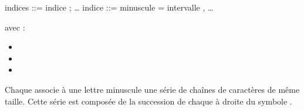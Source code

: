 \documentclass[letterpaper,10pt,french]{sphinxmanual}
\begin{document}
\begin{sphinxVerbatim}[commandchars=\\\{\}]
\PYGZlt{}indices\PYGZgt{} ::= \PYGZlt{}indice\PYGZgt{} ; …
\PYGZlt{}indice\PYGZgt{} ::= \PYGZlt{}minuscule\PYGZgt{} = \PYGZlt{}intervalle\PYGZgt{} , …
\end{sphinxVerbatim}

\sphinxAtStartPar
avec :
\begin{itemize}
\item {} 
\sphinxAtStartPar
{}

\item {} 
\sphinxAtStartPar
{}

\item {} 
\sphinxAtStartPar
{}

\end{itemize}

\sphinxAtStartPar
Chaque  associe à une lettre minuscule une série de chaînes de
caractères de même taille.
Cette série est composée de la succession de chaque
 à droite du symbole \sphinxcode{\sphinxupquote{=}}.
\end{document}
